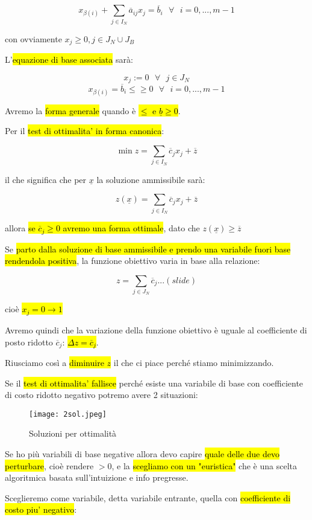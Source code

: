 $$x_{\beta(i)} + \sum_{j \in  I_N} \overline{a}_{ij}x_j = \overline{b}_i\ \ \ \forall\ \ \ i = 0, ..., m - 1$$

con ovviamente $x_j \geq 0, j \in J_N \cup J_B$

L'\hl{equazione di base associata} sarà:

$$x_j := 0\ \ \ \forall\ \ \ j \in J_N$$
$$x_{\beta(i)} = \overline{b}_i \leq \geq 0\ \ \ \forall\ \ \ i = 0, ..., m-1$$


Avremo la \hl{forma generale} quando è \hl{$\leq$ e $\underline{b} \geq 0$}.

Per il \hl{test di ottimalita' in forma canonica}:

$$\min z = \sum_{j \in  I_N} \overline{c}_jx_j + \overline{z}$$

il che significa che per $\underline{x}$ la soluzione ammissibile sarà:

$$z(\underline{x}) = \sum_{j \in  I_N} \overline{c}_jx_j + \overline{z}$$

allora \hl{se $\overline{c}_j \geq 0$ avremo una forma ottimale}, dato che $z(\underline{x}) \geq \overline{z}$

Se \hl{parto dalla soluzione di base ammissibile e prendo una variabile fuori base rendendola positiva}, la funzione obiettivo varia in base alla relazione:

$$z = \sum_{j \in J_N} \overline{c}_j...(slide)$$

cioè \hl{$x_j = 0 \to 1$}

Avremo quindi che la variazione della funzione obiettivo è uguale al coefficiente di posto ridotto $\overline{c}_j$: \hl{$\Delta z = \overline{c}_j$}.

Riusciamo così a \hl{diminuire $z$} il che ci piace perché stiamo minimizzando.

Se il \hl{test di ottimalita' fallisce} perché esiste una variabile di base con coefficiente di costo ridotto negativo potremo avere 2 situazioni:


\begin{figure}[H]
\centering
\texttt{[image: 2sol.jpeg]}
\caption{Soluzioni per ottimalità} 
\label{2sol}
\end{figure}


Se ho più variabili di base negative allora devo capire \hl{quale delle due devo perturbare}, cioè rendere $> 0$, e la \hl{scegliamo con un "euristica"} che è una scelta algoritmica basata sull'intuizione e info pregresse.

Sceglieremo come variabile, detta variabile entrante, quella con \hl{coefficiente di costo piu' negativo}:

